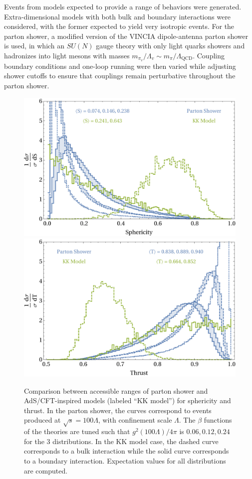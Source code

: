 Events from models expected to provide a range of behaviors were generated. Extra-dimensional models with both bulk and boundary interactions were considered, with the former expected to yield very isotropic events. For the parton shower, a modified version of the VINCIA dipole-antenna parton shower~\cite{Fischer:2016vfv} is used, in which an $SU(N)$ gauge theory with only light quarks showers and hadronizes into light mesons with masses $m_{\pi_v}/\Lambda_v \sim m_\pi/\Lambda_\text{QCD}$. Coupling boundary conditions and one-loop running were then varied while adjusting shower cutoffs to ensure that couplings remain perturbative throughout the parton shower.

\begin{figure}[tb!]
	\centering
	\includegraphics[width=\textwidth]{figures/DS_comparison_sphericity.pdf}\\
	\vspace{1cm}
	\includegraphics[width=\textwidth]{figures/DS_comparison_thrust.pdf}
	\caption{Comparison between accessible ranges of parton shower and AdS/CFT-inspired models (labeled ``KK model'') for sphericity and thrust. In the parton shower, the curves correspond to events produced at $\sqrt{s} = 100\Lambda$, with confinement scale $\Lambda$. The $\beta$ functions of the theories are tuned such that $g^2(100\Lambda)/4\pi$ is $0.06, 0.12, 0.24$ for the 3 distributions. In the KK model case, the dashed curve corresponds to a bulk interaction while the solid curve corresponds to a boundary interaction. Expectation values for all distributions are computed.}
	\label{fig:compplots}
\end{figure}

